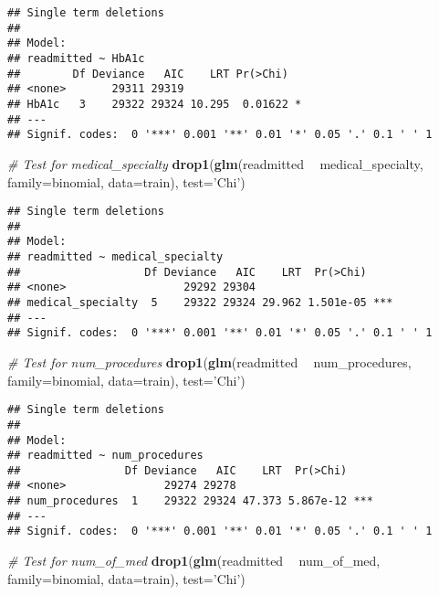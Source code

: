 \documentclass[
]{article}
\newenvironment{Shaded}{\begin{snugshade}}{\end{snugshade}}
\newcommand{\CommentTok}[1]{\textcolor[rgb]{0.56,0.35,0.01}{\textit{#1}}}
\newcommand{\DataTypeTok}[1]{\textcolor[rgb]{0.13,0.29,0.53}{#1}}
\newcommand{\KeywordTok}[1]{\textcolor[rgb]{0.13,0.29,0.53}{\textbf{#1}}}
\newcommand{\NormalTok}[1]{#1}
\newcommand{\OperatorTok}[1]{\textcolor[rgb]{0.81,0.36,0.00}{\textbf{#1}}}
\newcommand{\StringTok}[1]{\textcolor[rgb]{0.31,0.60,0.02}{#1}}
\begin{document}
\begin{verbatim}
## Single term deletions
## 
## Model:
## readmitted ~ HbA1c
##        Df Deviance   AIC    LRT Pr(>Chi)  
## <none>       29311 29319                  
## HbA1c   3    29322 29324 10.295  0.01622 *
## ---
## Signif. codes:  0 '***' 0.001 '**' 0.01 '*' 0.05 '.' 0.1 ' ' 1
\end{verbatim}

\begin{Shaded}
\begin{Highlighting}[]
\CommentTok{# Test for medical_specialty}
\KeywordTok{drop1}\NormalTok{(}\KeywordTok{glm}\NormalTok{(readmitted }\OperatorTok{~}\StringTok{ }\NormalTok{medical_specialty, }\DataTypeTok{family=}\NormalTok{binomial, }\DataTypeTok{data=}\NormalTok{train), }\DataTypeTok{test=}\StringTok{'Chi'}\NormalTok{)}
\end{Highlighting}
\end{Shaded}

\begin{verbatim}
## Single term deletions
## 
## Model:
## readmitted ~ medical_specialty
##                   Df Deviance   AIC    LRT  Pr(>Chi)    
## <none>                  29292 29304                     
## medical_specialty  5    29322 29324 29.962 1.501e-05 ***
## ---
## Signif. codes:  0 '***' 0.001 '**' 0.01 '*' 0.05 '.' 0.1 ' ' 1
\end{verbatim}

\begin{Shaded}
\begin{Highlighting}[]
\CommentTok{# Test for num_procedures}
\KeywordTok{drop1}\NormalTok{(}\KeywordTok{glm}\NormalTok{(readmitted }\OperatorTok{~}\StringTok{ }\NormalTok{num_procedures, }\DataTypeTok{family=}\NormalTok{binomial, }\DataTypeTok{data=}\NormalTok{train), }\DataTypeTok{test=}\StringTok{'Chi'}\NormalTok{)}
\end{Highlighting}
\end{Shaded}

\begin{verbatim}
## Single term deletions
## 
## Model:
## readmitted ~ num_procedures
##                Df Deviance   AIC    LRT  Pr(>Chi)    
## <none>               29274 29278                     
## num_procedures  1    29322 29324 47.373 5.867e-12 ***
## ---
## Signif. codes:  0 '***' 0.001 '**' 0.01 '*' 0.05 '.' 0.1 ' ' 1
\end{verbatim}

\begin{Shaded}
\begin{Highlighting}[]
\CommentTok{# Test for num_of_med}
\KeywordTok{drop1}\NormalTok{(}\KeywordTok{glm}\NormalTok{(readmitted }\OperatorTok{~}\StringTok{ }\NormalTok{num_of_med, }\DataTypeTok{family=}\NormalTok{binomial, }\DataTypeTok{data=}\NormalTok{train), }\DataTypeTok{test=}\StringTok{'Chi'}\NormalTok{)}
\end{Highlighting}
\end{Shaded}
\end{document}
